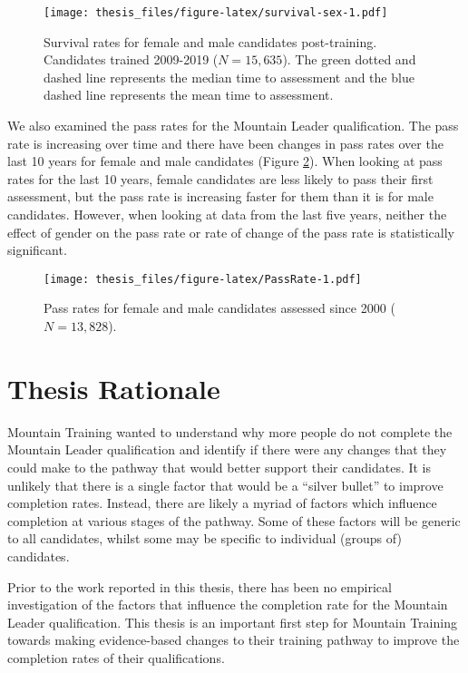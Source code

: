 \documentclass[
  12pt,
  a4paper,
]{book}
\begin{document}
\begin{figure}
\centering
\texttt{[image: thesis\_files/figure-latex/survival-sex-1.pdf]}
\caption{\label{fig:survival-sex}Survival rates for female and male candidates post-training. Candidates trained 2009-2019 (\(N = 15,635\)). The green dotted and dashed line represents the median time to assessment and the blue dashed line represents the mean time to assessment.}
\end{figure}

We also examined the pass rates for the Mountain Leader qualification. The pass rate is increasing over time and there have been changes in pass rates over the last 10 years for female and male candidates (Figure \ref{fig:PassRate}). When looking at pass rates for the last 10 years, female candidates are less likely to pass their first assessment, but the pass rate is increasing faster for them than it is for male candidates. However, when looking at data from the last five years, neither the effect of gender on the pass rate or rate of change of the pass rate is statistically significant.

\begin{figure}
\centering
\texttt{[image: thesis\_files/figure-latex/PassRate-1.pdf]}
\caption{\label{fig:PassRate}Pass rates for female and male candidates assessed since 2000 (\(N = 13,828\)).}
\end{figure}

\hypertarget{thesis-rationale}{%
\section{Thesis Rationale}\label{thesis-rationale}}

Mountain Training wanted to understand why more people do not complete the Mountain Leader qualification and identify if there were any changes that they could make to the pathway that would better support their candidates. It is unlikely that there is a single factor that would be a ``silver bullet'' to improve completion rates. Instead, there are likely a myriad of factors which influence completion at various stages of the pathway. Some of these factors will be generic to all candidates, whilst some may be specific to individual (groups of) candidates.

Prior to the work reported in this thesis, there has been no empirical investigation of the factors that influence the completion rate for the Mountain Leader qualification. This thesis is an important first step for Mountain Training towards making evidence-based changes to their training pathway to improve the completion rates of their qualifications.
\end{document}
